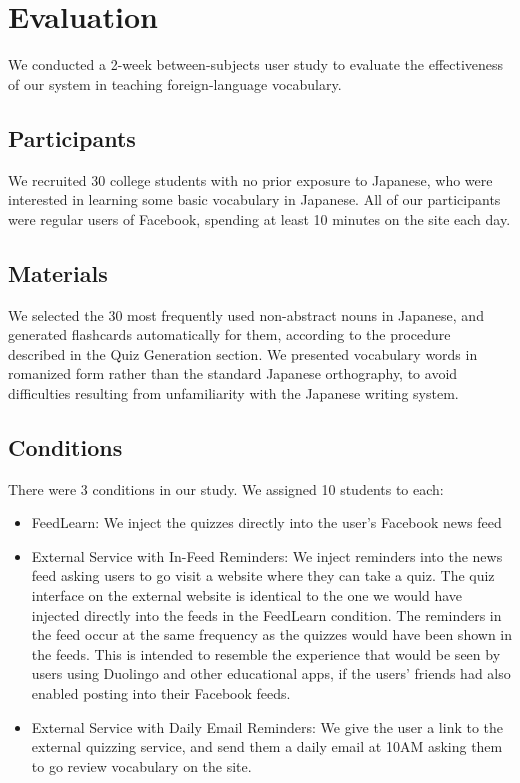 \documentclass{chi-ext}
\begin{document}
\section{Evaluation}

We conducted a 2-week between-subjects user study to evaluate the effectiveness of our system in teaching foreign-language vocabulary.

\subsection{Participants}

We recruited 30 college students with no prior exposure to Japanese, who were interested in learning some basic vocabulary in Japanese. All of our participants were regular users of Facebook, spending at least 10 minutes on the site each day.

\subsection{Materials}

We selected the 30 most frequently used non-abstract nouns in Japanese, and generated flashcards automatically for them, according to the procedure described in the Quiz Generation section. We presented vocabulary words in romanized form rather than the standard Japanese orthography, to avoid difficulties resulting from unfamiliarity with the Japanese writing system.

\subsection{Conditions}

There were 3 conditions in our study. We assigned 10 students to each:

\begin{itemize}
\item FeedLearn: We inject the quizzes directly into the user's Facebook news feed
\item External Service with In-Feed Reminders: We inject reminders into the news feed asking users to go visit a website where they can take a quiz. The quiz interface on the external website is identical to the one we would have injected directly into the feeds in the FeedLearn condition. The reminders in the feed occur at the same frequency as the quizzes would have been shown in the feeds. This is intended to resemble the experience that would be seen by users using Duolingo and other educational apps, if the users' friends had also enabled posting into their Facebook feeds.
\item External Service with Daily Email Reminders: We give the user a link to the external quizzing service, and send them a daily email at 10AM asking them to go review vocabulary on the site.
\end{itemize}
\end{document}
